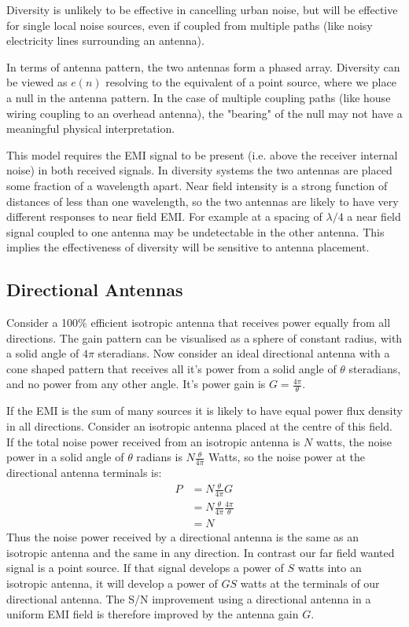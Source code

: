\documentclass{article}
\begin{document}
Diversity is unlikely to be effective in cancelling urban noise, but will be effective for single local noise sources, even if coupled from multiple paths (like noisy electricity lines surrounding an antenna).

In terms of antenna pattern, the two antennas form a phased array.  Diversity can be viewed as $e(n)$ resolving to the equivalent of a point source, where we place a null in the antenna pattern.  In the case of multiple coupling paths (like house wiring coupling to an overhead antenna), the "bearing" of the null may not have a meaningful physical interpretation.

This model requires the EMI signal to be present (i.e. above the receiver internal noise) in both received signals. In diversity systems the two antennas are placed some fraction of a wavelength apart. Near field intensity is a strong function of distances of less than one wavelength, so the two antennas are likely to have very different responses to near field EMI. For example at a spacing of $\lambda/4$ a near field signal coupled to one antenna may be undetectable in the other antenna. This implies the effectiveness of diversity will be sensitive to antenna placement.

\subsection{Directional Antennas}

Consider a 100\% efficient isotropic antenna that receives power equally from all directions.  The gain pattern can be visualised as a sphere of constant radius, with a solid angle of $4 \pi$ steradians. Now consider an ideal directional antenna with a cone shaped pattern that receives all it's power from a solid angle of $\theta$ steradians, and no power from any other angle.  It's power gain is $G=\frac{4 \pi}{\theta}$. 

If the EMI is the sum of many sources it is likely to have equal power flux density in all directions.  Consider an isotropic antenna placed at the centre of this field. If the total noise power received from an isotropic antenna is $N$ watts, the noise power in a solid angle of $\theta$ radians is $N \frac{\theta}{4 \pi}$ Watts, so the noise power at the directional antenna terminals is:
\begin{equation}
\begin{split}
 P &= N \frac{\theta}{4 \pi} G \\
   &= N \frac{\theta}{4 \pi} \frac{4 \pi}{\theta} \\
   &= N
\end{split}
\end{equation}
Thus the noise power received by a directional antenna is the same as an isotropic antenna and the same in any direction. In contrast our far field wanted signal is a point source. If that signal develops a power of $S$ watts into an isotropic antenna, it will develop a power of $GS$ watts at the terminals of our directional antenna. The S/N improvement using a directional antenna in a uniform EMI field is therefore improved by the antenna gain $G$.  
\end{document}

